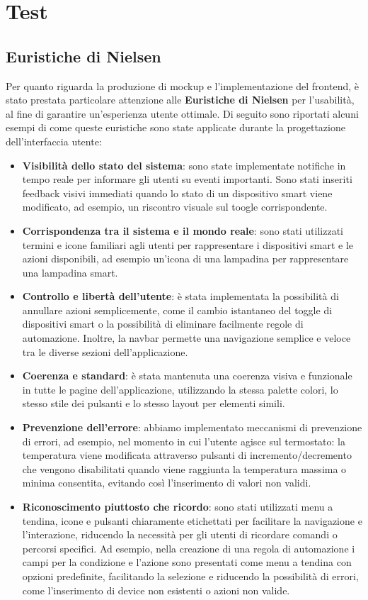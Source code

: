 \documentclass[a4paper,12pt]{article}
\begin{document}
\newpage
\section{Test}
\subsection{Euristiche di Nielsen}
Per quanto riguarda la produzione di mockup e l'implementazione del frontend, è stato prestata particolare attenzione alle \textbf{Euristiche di Nielsen} per l'usabilità, al fine di garantire un'esperienza utente ottimale. Di seguito sono riportati alcuni esempi di come queste euristiche sono state applicate durante la progettazione dell'interfaccia utente:
\begin{itemize}
    \item \textbf{Visibilità dello stato del sistema}: sono state implementate notifiche in tempo reale per informare gli utenti su eventi importanti. Sono stati inseriti feedback visivi immediati quando lo stato di un dispositivo smart viene modificato, ad esempio, un riscontro visuale sul toogle corrispondente.
    \item \textbf{Corrispondenza tra il sistema e il mondo reale}: sono stati utilizzati termini e icone familiari agli utenti per rappresentare i dispositivi smart e le azioni disponibili, ad esempio un'icona di una lampadina per rappresentare una lampadina smart.
    \item \textbf{Controllo e libertà dell'utente}: è stata implementata la possibilità di annullare azioni semplicemente, come il cambio istantaneo del toggle di dispositivi smart o la possibilità di eliminare facilmente regole di automazione. Inoltre, la navbar permette una navigazione semplice e veloce tra le diverse sezioni dell'applicazione.
    \item \textbf{Coerenza e standard}: è stata mantenuta una coerenza visiva e funzionale in tutte le pagine dell'applicazione, utilizzando la stessa palette colori, lo stesso stile dei pulsanti e lo stesso layout per elementi simili.
    \item \textbf{Prevenzione dell'errore}: abbiamo implementato meccanismi di prevenzione di errori, ad esempio, nel momento in cui l'utente agisce sul termostato: la temperatura viene modificata attraverso pulsanti di incremento/decremento che vengono disabilitati quando viene raggiunta la temperatura massima o minima consentita, evitando così l'inserimento di valori non validi.
    \item \textbf{Riconoscimento piuttosto che ricordo}: sono stati utilizzati menu a tendina, icone e pulsanti chiaramente etichettati per facilitare la navigazione e l'interazione, riducendo la necessità per gli utenti di ricordare comandi o percorsi specifici. Ad esempio, nella creazione di una regola di automazione i campi per la condizione e l'azione sono presentati come menu a tendina con opzioni predefinite, facilitando la selezione e riducendo la possibilità di errori, come l'inserimento di device non esistenti o azioni non valide.

\end{itemize}
\end{document}
